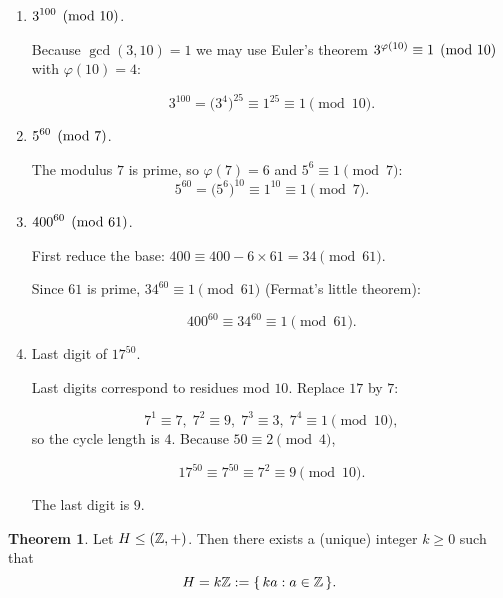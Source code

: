 \documentclass[12pt]{article}
\theoremstyle{definition} %
\newtheorem{theorem}{Theorem}
\theoremstyle{plain} %
\begin{document}
\begin{enumerate}[label=(\alph*)]

\item  \(\displaystyle 3^{100}\pmod{10}\).

      Because \(\gcd(3,10)=1\) we may use Euler’s theorem
      \(3^{\varphi(10)}\equiv1\pmod{10}\) with
      \(\varphi(10)=4\):

      \[
        3^{100}
          =\bigl(3^{4}\bigr)^{25}
          \equiv 1^{25}\equiv\boxed{1}\pmod{10}.
      \]

\item  \(\displaystyle 5^{60}\pmod{7}\).

      The modulus \(7\) is prime, so \(\varphi(7)=6\) and
      \(5^{6}\equiv1\pmod{7}\):
      \[
        5^{60}
          =\bigl(5^{6}\bigr)^{10}
          \equiv 1^{10}\equiv\boxed{1}\pmod{7}.
      \]

\item  \(\displaystyle 400^{60}\pmod{61}\).

      First reduce the base:
      \(400\equiv400-6\!\times\!61=34\pmod{61}\).

      Since \(61\) is prime,
      \(34^{60}\equiv1\pmod{61}\) (Fermat’s little theorem):

      \[
        400^{60}\equiv34^{60}\equiv\boxed{1}\pmod{61}.
      \]

\item  Last digit of \(17^{50}\).

      Last digits correspond to residues mod \(10\).
      Replace \(17\) by \(7\):

      \[
        7^{1}\equiv7,\;
        7^{2}\equiv9,\;
        7^{3}\equiv3,\;
        7^{4}\equiv1\pmod{10},
      \]
      so the cycle length is \(4\).
      Because \(50\equiv2\pmod{4}\),

      \[
        17^{50}\equiv7^{50}\equiv7^{2}\equiv9\pmod{10}.
      \]

      The last digit is \(\boxed{9}\).

\end{enumerate}

\begin{theorem}
  Let \(H\le(\Bbb Z,+)\).  Then there exists a (unique) integer
  \(k\ge0\) such that
  \[
        H = k\Bbb Z := \{\,ka : a\in\Bbb Z\,\}.
  \]
  \end{theorem}
  
\end{document}
